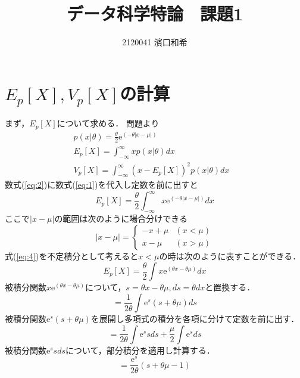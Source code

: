 \documentclass[uplatex,b5j]{jsarticle} %
\begin{document}
\title{データ科学特論　課題1}
\author{2120041 濱口和希}
\maketitle                      %

\section{$E_p[X], V_p[X]$の計算}
まず，$E_p[X]$について求める．
問題より
\begin{eqnarray}
    p(x|\theta)=\frac{\theta}{2}\mathrm{e}^{(-\theta|x-\mu|)} \label{eq:1} & \\
    E_p[X]=\int_{-\infty}^{\infty}xp(x|\theta)dx \label{eq:2} & \\
    V_p[X]=\int_{-\infty}^{\infty}(x-E_p[X])^2p(x|\theta)dx & \label{eq:3}
\end{eqnarray}
数式(\ref{eq:2})に数式(\ref{eq:1})を代入し定数を前に出すと
\begin{equation}
    E_p[X]=\frac{\theta}{2}\int_{-\infty}^{\infty}x\mathrm{e}^{(-\theta|x-\mu|)}dx \label{eq:4}
\end{equation}
ここで$|x-\mu|$の範囲は次のように場合分けできる
\begin{equation}\label{eq:5}
    |x-\mu| = \begin{cases}
    -x+\mu & (x<\mu) \\
     x-\mu & (x>\mu)
    \end{cases}
\end{equation}
式(\ref{eq:4})を不定積分として考えると$x<\mu$の時は次のように表すことができる．
\begin{equation}
    E_p[X]=\frac{\theta}{2}\int x\mathrm{e}^{(\theta x -\theta \mu)} dx \label{eq:6}
\end{equation}
被積分関数$x\mathrm{e}^{(\theta x -\theta \mu)}$について，$s=\theta x -\theta \mu, ds=\theta dx$と置換する．
\begin{equation}
    =\frac{1}{2\theta}\int \mathrm{e}^{s}(s+\theta \mu) ds \label{eq:7}
\end{equation}
被積分関数$\mathrm{e}^{s}(s+\theta \mu)$を展開し多項式の積分を各項に分けて定数を前に出す．
\begin{equation}
    =\frac{1}{2\theta}\int \mathrm{e}^{s}s ds + \frac{\mu}{2}\int \mathrm{e}^{s} ds \label{eq:8}
\end{equation}
被積分関数$\mathrm{e}^{s}s ds$について，部分積分を適用し計算する．
\begin{equation}
    =\frac{\mathrm{e}^{s}}{2\theta}(s+\theta\mu-1) \label{eq:9}
\end{equation}
\end{document}
